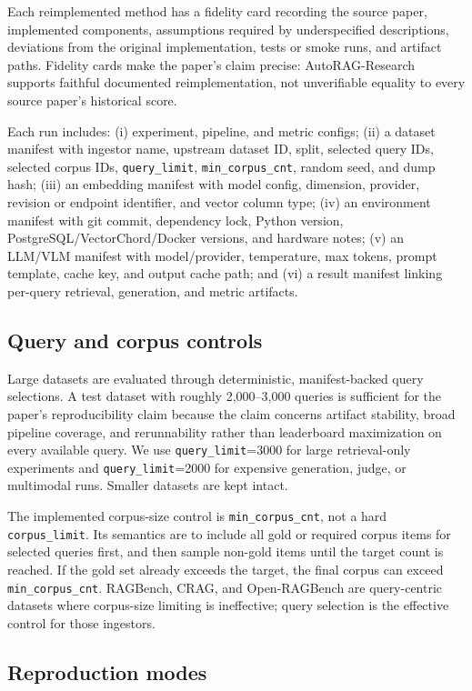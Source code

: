 \documentclass{article}
\newcommand{\framework}{AutoRAG-Research}
\newcommand{\qlimit}{\texttt{query\_limit}}
\newcommand{\climit}{\texttt{min\_corpus\_cnt}}
\begin{document}
Each reimplemented method has a fidelity card recording the source paper, implemented components, assumptions required by underspecified descriptions, deviations from the original implementation, tests or smoke runs, and artifact paths. Fidelity cards make the paper's claim precise: \framework{} supports faithful documented reimplementation, not unverifiable equality to every source paper's historical score.

Each run includes: (i) experiment, pipeline, and metric configs; (ii) a dataset manifest with ingestor name, upstream dataset ID, split, selected query IDs, selected corpus IDs, \qlimit{}, \climit{}, random seed, and dump hash; (iii) an embedding manifest with model config, dimension, provider, revision or endpoint identifier, and vector column type; (iv) an environment manifest with git commit, dependency lock, Python version, PostgreSQL/VectorChord/Docker versions, and hardware notes; (v) an LLM/VLM manifest with model/provider, temperature, max tokens, prompt template, cache key, and output cache path; and (vi) a result manifest linking per-query retrieval, generation, and metric artifacts.

\subsection{Query and corpus controls}

Large datasets are evaluated through deterministic, manifest-backed query selections. A test dataset with roughly 2,000--3,000 queries is sufficient for the paper's reproducibility claim because the claim concerns artifact stability, broad pipeline coverage, and rerunnability rather than leaderboard maximization on every available query. We use \qlimit{}=3000 for large retrieval-only experiments and \qlimit{}=2000 for expensive generation, judge, or multimodal runs. Smaller datasets are kept intact.

The implemented corpus-size control is \climit{}, not a hard \texttt{corpus\_limit}. Its semantics are to include all gold or required corpus items for selected queries first, and then sample non-gold items until the target count is reached. If the gold set already exceeds the target, the final corpus can exceed \climit{}. RAGBench, CRAG, and Open-RAGBench are query-centric datasets where corpus-size limiting is ineffective; query selection is the effective control for those ingestors.

\subsection{Reproduction modes}
\end{document}
